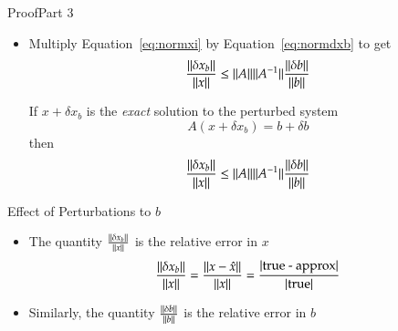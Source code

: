 \documentclass[10pt]{beamer}
\begin{document}
\begin{frame}{Proof}{Part 3}

\begin{itemize}
    \item Multiply Equation~\eqref{eq:normxi} by Equation~\eqref{eq:normdxb} to get
        \begin{equation}    \label{eq:dxbonx}
            \frac{{{\|\delta x_b\|}}}{{{\|x\|}}} \le {\ensuremath{{\|A\|}}}{\ensuremath{{\|A^{-1}\|}}} \frac{{{\|\delta b\|}}}{{{{\|b\|}}}}   
        \end{equation}

\begin{theorem}
If $x + \delta x_b$ is the \emph{exact} solution to the perturbed system
\begin{equation*}
    A (x + \delta x_b) = b + \delta b
\end{equation*}
then
\begin{equation*}
    \frac{{{\|\delta x_b\|}}}{{{\|x\|}}}
    \le 
    {\ensuremath{{\|A\|}}}{\ensuremath{{\|A^{-1}\|}}}
    \frac{{{\|\delta b\|}}}{{{{\|b\|}}}}
\end{equation*}
\end{theorem}

\end{itemize}
\end{frame}
\begin{frame}{Effect of Perturbations to $b$}

\begin{itemize}
    \item The quantity $\frac{{{\|\delta x_b\|}}}{{{\|x\|}}}$ is the relative error in $x$
        \begin{equation}    \label{eq:dxbonx}
            \frac{{{\|\delta x_b\|}}}{{{\|x\|}}} = \frac{{{\|x - \hat{x} \|}}}{{{\|x\|}}}= \frac{|\textrm{true - approx}|}{|\textrm{true}|}
        \end{equation}

    \item Similarly, the quantity $ \frac{{{\|\delta b\|}}}{{{{\|b\|}}}}$ is the relative error in $b$



\end{itemize}
\end{frame}
\end{document}
